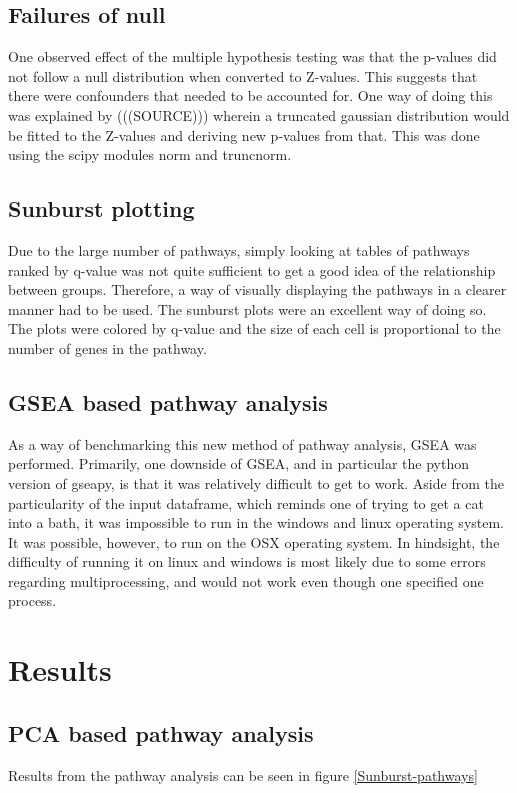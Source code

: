 \documentclass{kththesis}
\begin{document}
     \section{Failures of null}
     One observed effect of the multiple hypothesis testing was that the p-values did not follow a null distribution when converted to Z-values. This suggests that there were confounders that needed to be accounted for. One way of doing this was explained by (((SOURCE))) wherein a truncated gaussian distribution would be fitted to the Z-values and deriving new p-values from that. This was done using the scipy modules norm and truncnorm.

     \section{Sunburst plotting}
     Due to the large number of pathways, simply looking at tables of pathways ranked by q-value was not quite sufficient to get a good idea of the relationship between groups. Therefore, a way of visually displaying the pathways in a clearer manner had to be used. The sunburst plots were an excellent way of doing so. The plots were colored by q-value and the size of each cell is proportional to the number of genes in the pathway.



     \section{GSEA based pathway analysis}
     As a way of benchmarking this new method of pathway analysis, GSEA was performed. Primarily, one downside of GSEA, and in particular the python version of gseapy, is that it was relatively difficult to get to work. Aside from the particularity of the input dataframe, which reminds one of trying to get a cat into a bath, it was impossible to run in the windows and linux operating system. It was possible, however, to run on the OSX operating system.
     In hindsight, the difficulty of running it on linux and windows is most likely due to some errors regarding multiprocessing, and would not work even though one specified one process.




\chapter{Results}

     \section{PCA based pathway analysis}
     Results from the pathway analysis can be seen in figure \ref{Sunburst-pathways}
\end{document}

